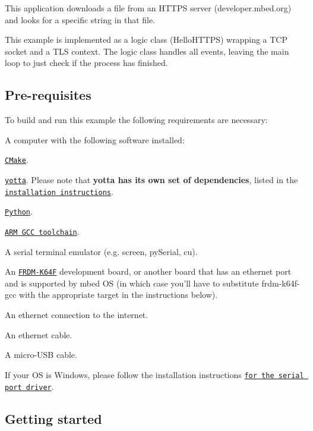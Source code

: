 This application downloads a file from an H\-T\-T\-P\-S server (developer.\-mbed.\-org) and looks for a specific string in that file.

This example is implemented as a logic class (Hello\-H\-T\-T\-P\-S) wrapping a T\-C\-P socket and a T\-L\-S context. The logic class handles all events, leaving the main loop to just check if the process has finished.

\subsection*{Pre-\/requisites}

To build and run this example the following requirements are necessary\-:
\begin{DoxyItemize}
\item A computer with the following software installed\-:
\begin{DoxyItemize}
\item \href{http://www.cmake.org/download/}{\tt C\-Make}.
\item \href{https://github.com/ARMmbed/yotta}{\tt yotta}. Please note that {\bfseries yotta has its own set of dependencies}, listed in the \href{http://armmbed.github.io/yotta/#installing-on-windows}{\tt installation instructions}.
\item \href{https://www.python.org/downloads/}{\tt Python}.
\item \href{https://launchpad.net/gcc-arm-embedded}{\tt A\-R\-M G\-C\-C toolchain}.
\item A serial terminal emulator (e.\-g. screen, py\-Serial, cu).
\end{DoxyItemize}
\item An \href{http://developer.mbed.org/platforms/FRDM-K64F/}{\tt F\-R\-D\-M-\/\-K64\-F} development board, or another board that has an ethernet port and is supported by mbed O\-S (in which case you'll have to substitute frdm-\/k64f-\/gcc with the appropriate target in the instructions below).
\item An ethernet connection to the internet.
\item An ethernet cable.
\item A micro-\/\-U\-S\-B cable.
\item If your O\-S is Windows, please follow the installation instructions \href{https://developer.mbed.org/handbook/Windows-serial-configuration}{\tt for the serial port driver}.
\end{DoxyItemize}

\subsection*{Getting started}


